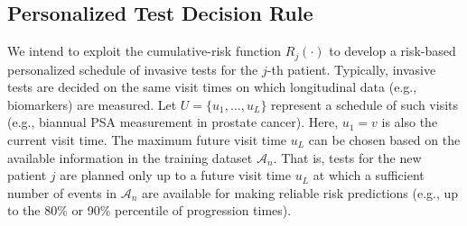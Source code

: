 \subsection{Personalized Test Decision Rule} 
\label{subsec:pers_schedule}
We intend to exploit the cumulative-risk function $R_j(\cdot)$ to develop a risk-based personalized schedule of invasive tests for the $j$-th patient. Typically, invasive tests are decided on the same visit times on which longitudinal data (e.g., biomarkers) are measured. Let $U = \{u_1, \ldots, u_L\}$ represent a schedule of such visits (e.g., biannual PSA measurement in prostate cancer).  Here, $u_1 = v$ is also the current visit time. The maximum future visit time $u_L$ can be chosen based on the available information in the training dataset $\mathcal A_n$. That is, tests for the new patient $j$ are planned only up to a future visit time $u_L$ at which a sufficient number of events in $\mathcal A_n$ are available for making reliable risk predictions (e.g., up to the 80\% or 90\% percentile of progression times).

